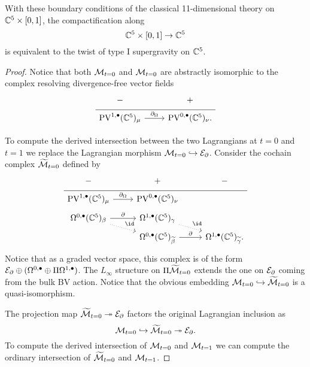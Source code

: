 \begin{prop}
With these boundary conditions of the classical 11-dimensional theory on $\mathbb C^5 \times [0,1]$, the compactification along 
\[
\mathbb C^5 \times [0,1] \to \mathbb C^5
\]
is equivalent to the twist of type I supergravity on $\mathbb C^5$. 
\end{prop}
\begin{proof}
Notice that both $\mathcal M_{t=0}$ and $\mathcal M_{t=0}$ are abstractly isomorphic to the complex resolving divergence-free vector fields
\begin{equation}
  \label{eq:lin2} 
  \begin{tikzcd}[row sep = 1 ex]
    - & + \\ \hline
    \PV^{1,\bu}(\CC^5)_\mu \ar[r, "\div"] & \PV^{0,\bu}(\CC^5)_\nu  .
\end{tikzcd}
\end{equation}

To compute the derived intersection between the two Lagrangians at $t=0$ and $t=1$ we replace the Lagrangian morphism $\mathcal M_{t=0} \hookrightarrow \mathcal E_{\partial}$. 
Consider the cochain complex $\widetilde {\mathcal M}_{t=0}$ defined by
\begin{equation}
  \label{eq:lin3} 
  \begin{tikzcd}[row sep = 1 ex]
    - & + & - \\ \hline
    \PV^{1,\bu}(\CC^5)_\mu \ar[r, "\div"] & \PV^{0,\bu}(\CC^5)_\nu \\ 
     \Omega^{0,\bu}(\CC^5)_\beta \ar[dr,dotted,"\id"]\ar[r, "\del"] & \Omega^{1,\bu}(\CC^5)_\gamma \ar[dr,dotted,"\id"] \\
     & \Omega^{0,\bu}(\CC^5)_{\til\beta} \ar[r, "\del"] & \Omega^{1,\bu}(\CC^5)_{\til\gamma} .
\end{tikzcd}
\end{equation}
Notice that as a graded vector space, this complex is of the form $\mathcal E_{\partial} \oplus (\Omega^{0,\bullet} \oplus \Pi \Omega^{1,\bullet})$. 
The $L_\infty$ structure on $\Pi \widetilde {\mathcal M}_{t=0}$ extends the one on $\mathcal E_{\partial}$ coming from the bulk BV action. 
Notice that the obvious embedding $\mathcal M_{t=0} \hookrightarrow \widetilde {\mathcal M}_{t=0}$ is a quasi-isomorphism.

The projection map $\widetilde {\mathcal M}_{t=0} \twoheadrightarrow \mathcal E_{\partial}$ factors the original Lagrangian inclusion as
\[
\mathcal M_{t=0} \hookrightarrow \widetilde {\mathcal M}_{t=0} \twoheadrightarrow \mathcal E_{\partial} .
\]
To compute the derived intersection of $\mathcal M_{t=0}$ and $\mathcal M_{t=1}$ we can compute the ordinary intersection of $\widetilde {\mathcal M}_{t=0}$ and $\mathcal M_{t=1}$. 


\end{proof}
